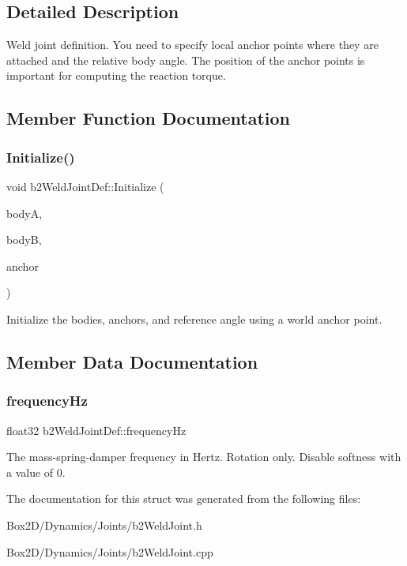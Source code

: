 \subsection{Detailed Description}
Weld joint definition. You need to specify local anchor points where they are attached and the relative body angle. The position of the anchor points is important for computing the reaction torque. 

\subsection{Member Function Documentation}
\mbox{\label{structb2_weld_joint_def_a9f6592c2a7eba6ce6e07e40c4e82aab5}} 
\subsubsection{\texorpdfstring{Initialize()}{Initialize()}}
{\footnotesize\ttfamily void b2\+Weld\+Joint\+Def\+::\+Initialize (\begin{DoxyParamCaption}\item[{\hyperlink{classb2_body}{b2\+Body} $\ast$}]{bodyA,  }\item[{\hyperlink{classb2_body}{b2\+Body} $\ast$}]{bodyB,  }\item[{const \hyperlink{structb2_vec2}{b2\+Vec2} \&}]{anchor }\end{DoxyParamCaption})}

Initialize the bodies, anchors, and reference angle using a world anchor point. 

\subsection{Member Data Documentation}
\mbox{\label{structb2_weld_joint_def_abf42ce852914af845e9203b341f55c87}} 
\subsubsection{\texorpdfstring{frequency\+Hz}{frequencyHz}}
{\footnotesize\ttfamily float32 b2\+Weld\+Joint\+Def\+::frequency\+Hz}

The mass-\/spring-\/damper frequency in Hertz. Rotation only. Disable softness with a value of 0. 

The documentation for this struct was generated from the following files\+:\begin{DoxyCompactItemize}
\item 
Box2\+D/\+Dynamics/\+Joints/b2\+Weld\+Joint.\+h\item 
Box2\+D/\+Dynamics/\+Joints/b2\+Weld\+Joint.\+cpp\end{DoxyCompactItemize}
